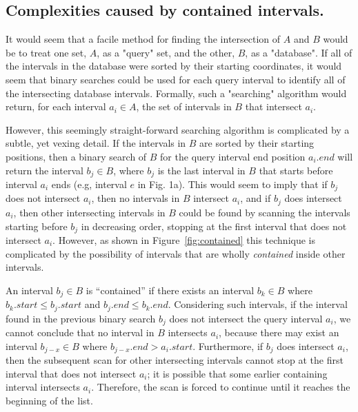 \documentclass{bioinfo}
\begin{document}
	\subsection{Complexities caused by contained intervals.}
	
	It would seem that a facile method for finding the intersection of
	$A$ and $B$ would be to treat one set, $A$, as a "query" set, and the
	other, $B$, as a "database". If all of the intervals in the 
	database were sorted by their starting coordinates, it would seem that binary
	searches could be used for each query interval to identify all of the intersecting
	database intervals. Formally, such a "searching" algorithm would return,
	for each interval $a_i \in A$, the set of intervals in $B$ that intersect $a_i$.

	However, this seemingly straight-forward searching algorithm is complicated by a 
	subtle, yet vexing detail. If the intervals in $B$ are sorted by their starting positions, 
	then a binary search of $B$ for the query interval end position $a_i.end$ will return the
	interval $b_j \in B$, where $b_j$ is the last interval in $B$ that starts before
	interval $a_i$ ends (e.g, interval $e$ in Fig. 1a).  This would seem to imply that 
	if $b_j$ does not intersect $a_i$, then no intervals in $B$ intersect $a_i$, and if $b_j$ does intersect
	$a_i$, then other intersecting intervals in $B$ could be found by scanning the
	intervals starting before $b_j$ in decreasing order, stopping at the first
	interval that does not intersect $a_i$.  However, as shown in Figure~\ref{fig:contained} 
	this technique is complicated by the possibility of intervals that are wholly {\em contained} 
	inside other intervals. 
	
	An interval $b_j\in B$ is ``contained'' if there exists an interval
	$b_k \in B$ where $b_k.start \leq b_j.start$ and $b_j.end \leq
	b_k.end$.  Considering such intervals, if the interval found in the
	previous binary search $b_j$ does not intersect the query interval
	$a_i$, we cannot conclude that no interval in $B$ intersects $a_i$,
	because there may exist an interval $b_{j-x} \in B$ where $b_{j-x}.end
	> a_i.start$.  Furthermore, if $b_j$ does intersect $a_i$, then the
	subsequent scan for other intersecting intervals cannot stop at the
	first interval that does not intersect $a_i$; it is possible that some
	earlier containing interval intersects $a_i$. Therefore, the scan is
	forced to continue until it reaches the beginning of the list.
	
\end{document}
